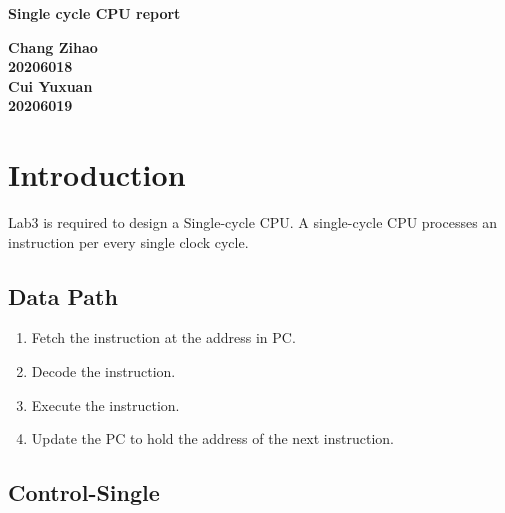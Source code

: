 \documentclass[12pt,a4paper]{article}
\begin{document}
\begin{titlepage}
  \begin{center}
    \vspace*{1cm}

    \textbf{\Huge Single cycle CPU  report}

    \vspace{0.5cm}

         
    \vspace{1.5cm}

    \textbf{\large Chang Zihao \\20206018\\\large Cui Yuxuan\\20206019}

    \vfill
         

         
    \vspace{0.8cm}
  


         
\end{center}
\end{titlepage}


\newpage
\tableofcontents
\thispagestyle{empty}

\newpage
{}
\setcounter{page}{1}

\section{Introduction}

Lab3 is required to design a Single-cycle CPU.
A single-cycle CPU processes an instruction per every single clock cycle.

\subsection{Data Path}

\begin{enumerate}
\item Fetch the instruction at the address in PC.
\item Decode the instruction.
\item Execute the instruction.
\item Update the PC to hold the address of the next instruction. 
\end{enumerate}

\subsection{Control-Single}
\end{document}
